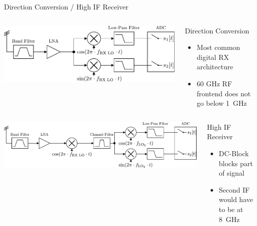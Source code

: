 \documentclass[10pt]{beamer}
\begin{document}
\begin{frame}{Direction Conversion / High IF Receiver}
  \begin{columns}[T]
    \begin{column}{.6\textwidth}
      \vspace{5mm}
      \includegraphics[width=\textwidth]{figures/rx_4_bd}
    \end{column}
    \begin{column}{.4\textwidth}
      \begin{block}{Direction Conversion}
        \begin{itemize}
        \item Most common digital RX architecture
        \item[\frownie] 60 GHz RF frontend does not go below 1~GHz
        \end{itemize}
      \end{block}
    \end{column}
  \end{columns}
  \vspace{4ex}
  \begin{columns}[T]
    \begin{column}{.6\textwidth}
      \vspace{5mm}
      \includegraphics[width=\textwidth]{figures/rx_0_bd}
    \end{column}
    \begin{column}{.4\textwidth}
      \begin{block}{High IF Receiver}
        \begin{itemize}
        \item DC-Block blocks part of signal
        \item[\frownie] Second IF would have to be at 8~GHz
        \end{itemize}
      \end{block}
    \end{column}
  \end{columns}
\end{frame}
\end{document}
